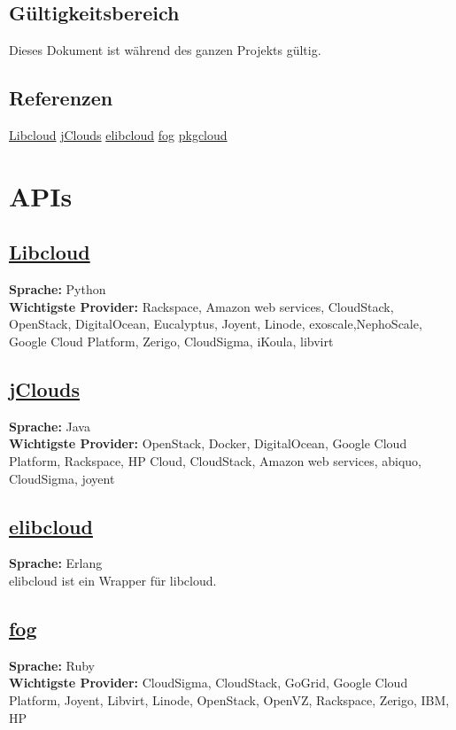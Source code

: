 \documentclass[11pt]{scrartcl}
\begin{document}
\subsection{Gültigkeitsbereich}
Dieses Dokument ist während des ganzen Projekts gültig.

\subsection{Referenzen}
\href{https://libcloud.apache.org}{Libcloud}
\href{https://jclouds.apache.org}{jClouds}
\href{https://github.com/esl/elibcloud}{elibcloud}
\href{https://github.com/fog/fog/blob/master/lib/fog/openstack/docs/getting_started.md}{fog}
\href{https://github.com/pkgcloud/pkgcloud}{pkgcloud}

\newpage

\section{APIs}
\subsection{\href{https://libcloud.apache.org}{Libcloud}}
\textbf{Sprache: }Python\\
\textbf{Wichtigste Provider: }Rackspace, Amazon web services, CloudStack, OpenStack, DigitalOcean, Eucalyptus, Joyent, Linode, exoscale,NephoScale, Google Cloud Platform, Zerigo, CloudSigma, iKoula, libvirt\\

\subsection{\href{https://jclouds.apache.org}{jClouds}}
\textbf{Sprache: }Java\\
\textbf{Wichtigste Provider: }OpenStack, Docker, DigitalOcean, Google Cloud Platform, Rackspace, HP Cloud, CloudStack, Amazon web services, abiquo, CloudSigma, joyent\\

\subsection{\href{https://github.com/esl/elibcloud}{elibcloud}}
\textbf{Sprache: }Erlang\\
elibcloud ist ein Wrapper für libcloud.\\

\subsection{\href{https://github.com/fog/fog/blob/master/lib/fog/openstack/docs/getting_started.md}{fog}}
\textbf{Sprache: }Ruby\\
\textbf{Wichtigste Provider: }CloudSigma, CloudStack, GoGrid, Google Cloud Platform, Joyent, Libvirt, Linode, OpenStack, OpenVZ, Rackspace, Zerigo, IBM, HP\\
\end{document}

